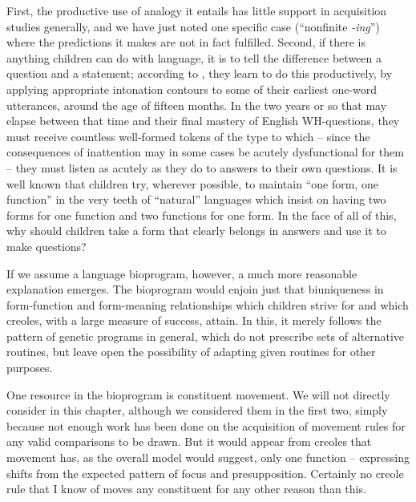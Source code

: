 First, the productive use of analogy it entails has little support in acquisition studies generally, and we have just noted one specific case (``nonfinite \textit{-ing}'') where the predictions it makes are not in fact fulfilled. Second, if there is anything children can do with language, it is to tell the difference between a question and a statement; according to \citet{Halliday1975}, they learn to do this productively, by applying appropriate intonation contours to some of their earliest one-word utterances, around the age of fifteen months. In the two years or so that may elapse between that time and their final mastery of English WH-questions, they must receive countless well-formed tokens of the type to which -- since the consequences of inattention may in some cases be acutely dysfunctional for them -- they must listen as acutely as they do to answers to their own questions. It is well known that children try, wherever possible, to maintain ``one form, one function'' in the very teeth of ``natural'' languages which insist on having two forms for one function and two functions for one form. In the face of
all of this, why should children take a form that clearly belongs in answers\enlargethispage{1\baselineskip} and use it to make questions?

If we assume a language bioprogram, however, a much more reasonable explanation emerges. The bioprogram would enjoin just that biuniqueness in form-function and form-meaning relationships which children strive for and which creoles, with a large measure of success, attain. In this, it merely follows the pattern of genetic programs in general, which do not prescribe sets of alternative routines, but leave open the possibility of adapting given routines for other purposes.

One resource in the bioprogram is constituent movement. We will not directly consider  in this chapter, although we considered them in the first two, simply because not enough work has been done on the acquisition of movement rules for any valid comparisons to be drawn. But it would appear from creoles that movement has, as the overall model would suggest, only one function -- expressing shifts from the expected pattern of focus and presupposition. Certainly no creole rule that I know of moves any constituent for any other reason than this.

